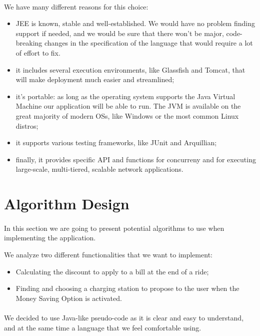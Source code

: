\documentclass[english]{article}
\begin{document}
\paragraph{}
We have many different reasons for this choice:
\begin{itemize}
	\item JEE is known, stable and well-established. We would have no problem finding support if needed, and we would be sure that there won't be major, code-breaking changes in the specification of the language that would require a lot of effort to fix.
	\item it includes several execution environments, like Glassfish and Tomcat, that will make deployment much easier and streamlined;
	\item it's portable: as long as the operating system supports the Java Virtual Machine our application will be able to run. The JVM is available on the great majority of modern OSs, like Windows or the most common Linux distros;
	\item it supports various testing frameworks, like JUnit and Arquillian;
	\item finally, it provides specific API and functions for concurreny and for executing large-scale, multi-tiered, scalable network applications.
\end{itemize}



\newpage

\section{Algorithm Design}

\paragraph{}
In this section we are going to present potential algorithms to use when implementing the application.

We analyze two different functionalities that we want to implement:
\begin{itemize}
	\item{Calculating the discount to apply to a bill at the end of a ride;}
	\item{Finding and choosing a charging station to propose to the user when the Money Saving Option is activated.}
\end{itemize}

\paragraph{}
We decided to use Java-like pseudo-code as it is clear and easy to understand, and at the same time a language that we feel comfortable using.
\end{document}
